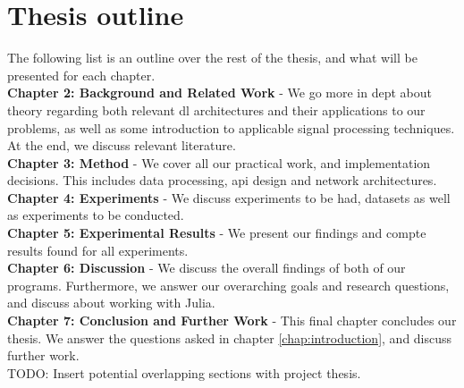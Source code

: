 \section{Thesis outline}

The following list is an outline over the rest of the thesis, and what will be presented for each chapter. \\


\textbf{Chapter 2: Background and Related Work} - We go more in dept about theory regarding both relevant \acrshort{dl} architectures and their applications to our problems, as well as some introduction to applicable signal processing techniques. At the end, we discuss relevant literature.  \\

\textbf{Chapter 3: Method} - We cover all our practical work, and implementation decisions. This includes data processing, \acrshort{api} design and network architectures. \\


\textbf{Chapter 4: Experiments} - We discuss experiments to be had, datasets as well as experiments to be conducted. \\

\textbf{Chapter 5: Experimental Results} - We present our findings and compte results found for all experiments. \\

\textbf{Chapter 6: Discussion} - We discuss the overall findings of both of our programs. Furthermore, we answer our overarching goals and research questions, and discuss about working with Julia. \\

\textbf{Chapter 7: Conclusion and Further Work} - This final chapter concludes our thesis. We answer the questions asked in chapter \ref{chap:introduction}, and discuss further work. \\

TODO: Insert potential overlapping sections with project thesis.